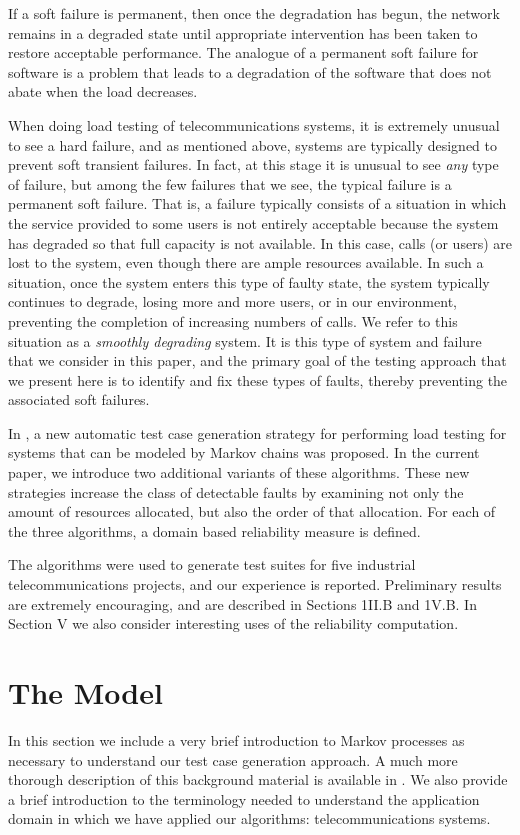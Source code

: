 \documentclass[journal, twoside]{IEEEtran}
\begin{document}
 If a soft failure is permanent, then once the degradation has
begun, the network remains in a degraded state until appropriate intervention has been taken to restore acceptable performance. The analogue of a permanent soft failure for software is
a problem that leads to a degradation of the software that does
not abate when the load decreases.

\IEEEpubidadjcol
When doing load testing of telecommunications systems, it
is extremely unusual to see a hard failure, and as mentioned
above, systems are typically designed to prevent soft transient
failures. In fact, at this stage it is unusual to see \textit{any} type of
failure, but among the few failures that we see, the typical failure is a permanent soft failure. That is, a failure typically consists of a situation in which the service provided to some users
is not entirely acceptable because the system has degraded so
that full capacity is not available. In this case, calls (or users)
are lost to the system, even though there are ample resources
available. In such a situation, once the system enters this type
of faulty state, the system typically continues to degrade, losing more and more users, or in our environment, preventing
the completion of increasing numbers of calls. We refer to this
situation as a \textit{smoothly degrading} system. It is this type of
system and failure that we consider in this paper, and the primary goal of the testing approach that we present here is to
identify and fix these types of faults, thereby preventing the
associated soft failures.
\IEEEpubidadjcol

In \cite{b1}, a new automatic test case generation strategy for performing load testing for systems that can be modeled by
Markov chains was proposed. In the current paper, we introduce two additional variants of these algorithms. These new
strategies increase the class of detectable faults by examining
not only the amount of resources allocated, but also the order
of that allocation. For each of the three algorithms, a domain based reliability measure is defined.

The algorithms were used to generate test suites for five industrial telecommunications projects, and our experience is
reported. Preliminary results are extremely encouraging, and
are described in Sections 1II.B and 1V.B. In Section V we also
consider interesting uses of the reliability computation. 
\section{The Model}
In this section we include a very brief introduction to
Markov processes as necessary to understand our test case
generation approach. A much more thorough description of
this background material is available in \cite{b5}. We also provide a
brief introduction to the terminology needed to understand the
application domain in which we have applied our algorithms:
telecommunications systems.
\end{document}
